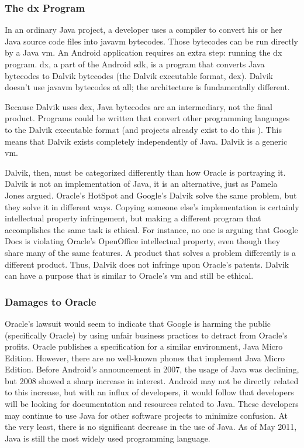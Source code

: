 \documentclass[11pt]{article}
\begin{document}
\begin{multicols}{2}
\subsubsection{The dx Program} %
\label{ssub:dex}

In an ordinary Java project, a developer uses a compiler to convert his or her
Java source code files into \gls{javavm} \glspl{bytecode}.  Those
\glspl{bytecode} can be run directly by a Java \gls{vm}.  An Android application
requires an extra step: running the dx program.  dx, a part of the Android
\gls{sdk}, is a program that converts Java \glspl{bytecode} to Dalvik
\glspl{bytecode} (the Dalvik executable format, dex).  Dalvik doesn't use
\gls{javavm} \glspl{bytecode} at all; the architecture is fundamentally
different.

Because Dalvik uses dex, Java \glspl{bytecode} are an intermediary, not the
final product.  Programs could be written that convert other programming
languages to the Dalvik executable format (and projects already exist to do this
\cite{ruboto}).  This means that Dalvik exists completely independently of Java.
Dalvik is a generic \gls{vm}.

Dalvik, then, must be categorized differently than how Oracle is portraying it.
Dalvik is not an implementation of Java, it is an alternative, just as Pamela
Jones argued. \cite{groklaw}  Oracle's HotSpot and Google's Dalvik solve the
same problem, but they solve it in different ways.  Copying someone else's
implementation is certainly intellectual property infringement, but making a
different program that accomplishes the same task is ethical.  For instance, no
one is arguing that Google Docs is violating Oracle's OpenOffice intellectual
property, even though they share many of the same features.  A product that
solves a problem differently is a different product.  Thus, Dalvik does not
infringe upon Oracle's patents.  Dalvik can have a purpose that is similar to
Oracle's \gls{vm} and still be ethical.


\subsubsection{Damages to Oracle} %
\label{ssub:oracle-damage}

Oracle's lawsuit would seem to indicate that Google is harming the public
(specifically Oracle) by using unfair business practices to detract from
Oracle's profits.  Oracle publishes a specification for a similar environment,
Java Micro Edition.  However, there are no well-known phones that implement Java
Micro Edition.  Before Android's announcement in 2007, the usage of Java was
declining, but 2008 showed a sharp increase in interest.  \cite{tiobe}  Android
may not be directly related to this increase, but with an influx of developers,
it would follow that developers will be looking for documentation and resources
related to Java.  These developers may continue to use Java for other software
projects to minimize confusion.  At the very least, there is no significant
decrease in the use of Java.  As of May 2011, Java is still the most widely used
programming language.  \cite{tiobe}


\end{multicols}
\end{document}
